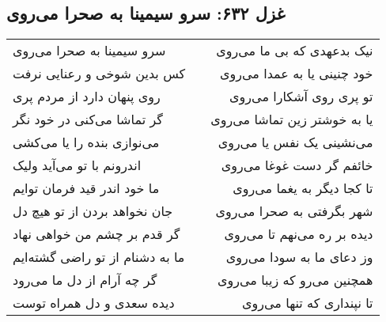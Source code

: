 \begin{center}
\section*{غزل ۶۳۲: سرو سیمینا به صحرا می‌روی}
\label{sec:632}
\begin{longtable}{l p{0.5cm} r}
سرو سیمینا به صحرا می‌روی
&&
نیک بدعهدی که بی ما می‌روی
\\
کس بدین شوخی و رعنایی نرفت
&&
خود چنینی یا به عمدا می‌روی
\\
روی پنهان دارد از مردم پری
&&
تو پری روی آشکارا می‌روی
\\
گر تماشا می‌کنی در خود نگر
&&
یا به خوشتر زین تماشا می‌روی
\\
می‌نوازی بنده را یا می‌کشی
&&
می‌نشینی یک نفس یا می‌روی
\\
اندرونم با تو می‌آید ولیک
&&
خائفم گر دست غوغا می‌روی
\\
ما خود اندر قید فرمان توایم
&&
تا کجا دیگر به یغما می‌روی
\\
جان نخواهد بردن از تو هیچ دل
&&
شهر بگرفتی به صحرا می‌روی
\\
گر قدم بر چشم من خواهی نهاد
&&
دیده بر ره می‌نهم تا می‌روی
\\
ما به دشنام از تو راضی گشته‌ایم
&&
وز دعای ما به سودا می‌روی
\\
گر چه آرام از دل ما می‌رود
&&
همچنین می‌رو که زیبا می‌روی
\\
دیده سعدی و دل همراه توست
&&
تا نپنداری که تنها می‌روی
\\
\end{longtable}
\end{center}
